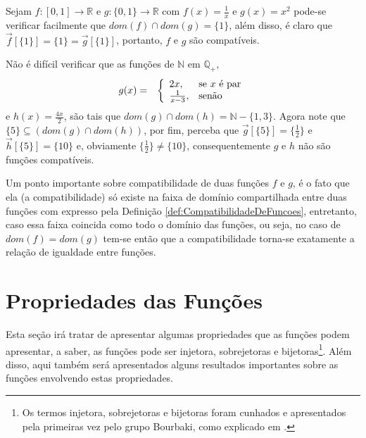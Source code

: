 \begin{exemplo}\label{exe:FuncoesCompativeis1}
	Sejam $f: [0,1] \rightarrow \mathbb{R}$ e $g: \{0,1\} \rightarrow \mathbb{R}$ com $f(x) = \displaystyle\frac{1}{x}$ e $g(x) = x^2$ pode-se verificar facilmente que $dom(f) \cap dom(g) = \{1\}$, além disso, é claro que $\overrightarrow{f}[\{1\}] = \{1\} = \overrightarrow{g}[\{1\}]$, portanto, $f$ e $g$ são compatíveis.
\end{exemplo}

\begin{exemplo}\label{exe:FuncoesCompativeis2}
	Não é difícil verificar que as funções de $\mathbb{N}$ em $\mathbb{Q}_+$,
	\begin{eqnarray*}
		g(x) & = & \left\{\begin{array}{ll}	2x, & \hbox{se } x \mbox{ é par}\\\frac{1}{x - 3},  & \hbox{senão}\end{array}\right.
	\end{eqnarray*}
	e $h(x) =  \displaystyle\frac{4x}{2}$, são tais que $dom(g) \cap dom(h) = \mathbb{N} - \{1, 3\}$. Agora note que $\{5\} \subseteq (dom(g) \cap dom(h))$, por fim, perceba que $\overrightarrow{g}[\{5\}] = \displaystyle\Big\{\frac{1}{2}\Big\}$ e $\overrightarrow{h}[\{5\}] = \{10\}$ e, obviamente $\displaystyle\Big\{\frac{1}{2}\Big\} \neq \{10\}$, consequentemente $g$ e $h$ não são funções compatíveis.
\end{exemplo}

Um ponto importante sobre compatibilidade de duas funções $f$ e $g$, é o fato que ela (a compatibilidade) só existe na faixa de domínio compartilhada entre duas funções com expresso pela Definição \ref{def:CompatibilidadeDeFuncoes}, entretanto, caso essa faixa coincida como todo o domínio das funções, ou seja, no caso de $dom(f) = dom(g)$ tem-se então que a compatibilidade torna-se exatamente a relação de igualdade entre funções.

\section{Propriedades das Funções}

Esta seção irá tratar de apresentar algumas propriedades que as funções podem apresentar, a saber, as funções pode ser injetora, sobrejetoras e bijetoras\footnote{Os termos injetora, sobrejetoras e bijetoras foram cunhados e apresentados pela primeiras vez pelo grupo Bourbaki, como explicado em \cite{jeff-miller-web}.}. Além disso, aqui também será apresentados alguns resultados importantes sobre as funções envolvendo estas propriedades.

